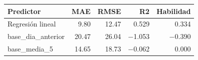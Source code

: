 \begin{tabular}{lrrrr}
\toprule
Predictor & MAE & RMSE & R2 & Habilidad \\
\midrule
Regresión lineal & 9.80 & 12.47 & 0.529 & 0.334 \\
base\_dia\_anterior & 20.47 & 26.04 & $-$1.053 & $-$0.390 \\
base\_media\_5 & 14.65 & 18.73 & $-$0.062 & 0.000 \\
\bottomrule
\end{tabular}
